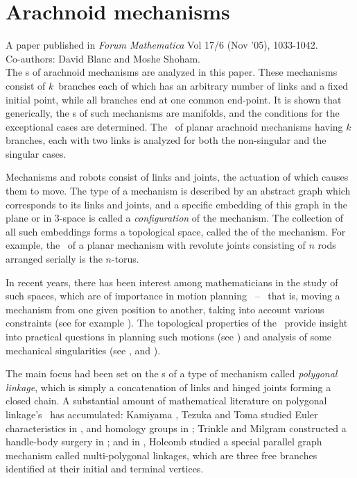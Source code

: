 \chapter{Arachnoid mechanisms}
\label{chap1}

\textsf{A paper published in \textsl{Forum Mathematica} Vol 17/6
(Nov '05),
1033-1042.}\\
\textsf{Co-authors: David Blanc and Moshe Shoham.}\\

The \cspace s of arachnoid mechanisms are analyzed in this paper.
These mechanisms consist of $k$\ branches each of which has an
arbitrary number of links and a fixed initial point, while all
branches end at one common end-point. It is shown that
generically, the \cspace s of such mechanisms are manifolds, and
the conditions for the exceptional cases are determined. The
\cspace\  of planar arachnoid mechanisms having $k$ branches, each
with two links is analyzed for both the non-singular and the
singular cases.



Mechanisms and robots consist of links and joints, the actuation
of which causes them to move. The type of a mechanism is described
by an abstract graph which corresponds to its links and joints,
and a specific embedding of this graph in the plane or in
$3$-space is called a \emph{configuration} of the mechanism. The
collection of all such embeddings forms a topological space,
called the \emph{\cspace} of the mechanism. For example, the
\cspace\ of a planar mechanism with revolute joints consisting of
$n$ rods arranged serially is the $n$-torus.

In recent years, there has been interest among mathematicians in
the study of such spaces, which are of importance in motion
planning \ -- \ that is, moving a mechanism from one given
position to another, taking into account various constraints (see
for example \cite{MT2}). The topological properties of the
\cspace\ provide insight into practical questions in planning such
motions (see \cite{F}) and analysis of some mechanical
singularities (see \cite{NM}, and \cite{ZFB}).

The main focus had been set on the \cspace s of a type of
mechanism called \emph{polygonal linkage}, which is simply a
concatenation of links and hinged joints forming a closed chain. A
substantial amount of mathematical literature on polygonal
linkage's \cspace\ has accumulated: Kamiyama , Tezuka and Toma
studied Euler characteristics in \cite{K}, and homology groups in
\cite {KT,KTT}; Trinkle and Milgram constructed a handle-body
surgery in \cite{MT1}; and in \cite{Ho}, Holcomb studied a special
parallel graph mechanism called multi-polygonal linkages, which
are three free branches identified at their initial and terminal
vertices.

